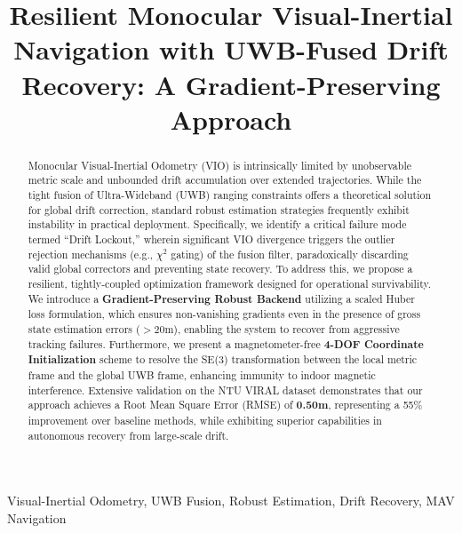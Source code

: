 \documentclass[conference]{IEEEtran}
\begin{document}
\title{Resilient Monocular Visual-Inertial Navigation with UWB-Fused Drift Recovery: A Gradient-Preserving Approach}

\author{
}

\maketitle

\begin{abstract}
Monocular Visual-Inertial Odometry (VIO) is intrinsically limited by unobservable metric scale and unbounded drift accumulation over extended trajectories. While the tight fusion of Ultra-Wideband (UWB) ranging constraints offers a theoretical solution for global drift correction, standard robust estimation strategies frequently exhibit instability in practical deployment. Specifically, we identify a critical failure mode termed ``Drift Lockout,'' wherein significant VIO divergence triggers the outlier rejection mechanisms (e.g., $\chi^2$ gating) of the fusion filter, paradoxically discarding valid global correctors and preventing state recovery. To address this, we propose a resilient, tightly-coupled optimization framework designed for operational survivability. We introduce a \textbf{Gradient-Preserving Robust Backend} utilizing a scaled Huber loss formulation, which ensures non-vanishing gradients even in the presence of gross state estimation errors ($>$20m), enabling the system to recover from aggressive tracking failures. Furthermore, we present a magnetometer-free \textbf{4-DOF Coordinate Initialization} scheme to resolve the SE(3) transformation between the local metric frame and the global UWB frame, enhancing immunity to indoor magnetic interference. Extensive validation on the NTU VIRAL dataset demonstrates that our approach achieves a Root Mean Square Error (RMSE) of \textbf{0.50m}, representing a 55\% improvement over baseline methods, while exhibiting superior capabilities in autonomous recovery from large-scale drift.
\end{abstract}

\begin{IEEEkeywords}
Visual-Inertial Odometry, UWB Fusion, Robust Estimation, Drift Recovery, MAV Navigation
\end{IEEEkeywords}
\end{document}
